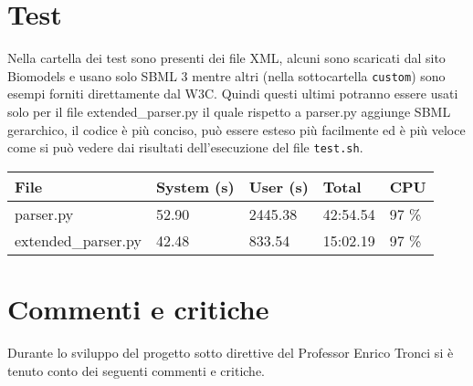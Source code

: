 \documentclass{article}
\begin{document}
\section{Test}
Nella cartella dei test sono presenti dei file XML, alcuni sono scaricati dal sito Biomodels e usano solo SBML 3 mentre altri (nella sottocartella \texttt{custom}) sono esempi forniti direttamente dal W3C. Quindi questi ultimi potranno essere usati solo per il file extended\_parser.py il quale rispetto a parser.py aggiunge SBML gerarchico, il codice è più conciso, può essere esteso più facilmente ed è più veloce come si può vedere dai risultati dell'esecuzione del file \texttt{test.sh}. 

\begin{table}[h!t] 
    \label{performance}
    \caption{Performance}
    \centering
    \begin{longtable}{p{3.3cm}p{2cm}p{1.5cm}p{1.5cm}p{1.5cm}}
        \textbf{File} & \textbf{System (s)} & \textbf{User (s)} & \textbf{Total} & \textbf{CPU} \\
        \hline
        parser.py & 52.90 & 2445.38 & 42:54.54 & 97 \% \\
        extended\_parser.py & 42.48 & 833.54 & 15:02.19 & 97 \% \\
        \hline
    \end{longtable}
\end{table}


\section{Commenti e critiche}
Durante lo sviluppo del progetto sotto direttive del Professor Enrico Tronci si è tenuto conto dei seguenti commenti e critiche. 
\end{document}
